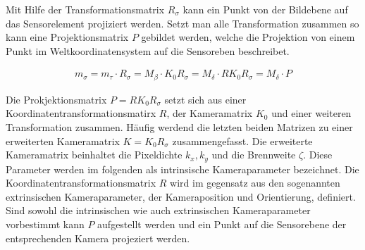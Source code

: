 Mit Hilfe der Transformationsmatrix $R_\sigma$ kann ein Punkt von der Bildebene auf das Sensorelement projiziert werden. Setzt man alle Transformation zusammen so kann eine Projektionsmatrix $P$ gebildet werden, welche die Projektion von einem Punkt im Weltkoordinatensystem auf die Sensoreben beschreibet. 



\begin{gather}
	m_\sigma = m_\tau \cdot R_\sigma = M_\beta \cdot K_0R_\sigma= M_\delta \cdot RK_0R_\sigma= M_\delta \cdot P
\end{gather}


Die Prokjektionsmatrix $P=RK_0R_\sigma$ setzt sich aus einer Koordinatentransformationsmatirx $R$, der Kameramatrix $K_0$ und einer weiteren Transformation zusammen. Häufig werdend die letzten beiden Matrizen zu einer erweiterten Kameramatrix $K=K_0R_\sigma$ zusammengefasst. Die erweiterte Kameramatrix beinhaltet die Pixeldichte $k_x,k_y$ und die Brennweite $\zeta$. Diese Parameter werden im folgenden als intrinsische Kameraparameter bezeichnet. Die Koordinatentransformationsmatrix $R$ wird im gegensatz aus den sogenannten extrinsischen Kameraparameter, der Kameraposition und Orientierung, definiert. Sind sowohl die intrinsischen wie auch extrinsischen Kameraparameter vorbestimmt kann $P$ aufgestellt werden und ein Punkt auf die Sensorebene der entsprechenden Kamera projeziert werden. 


